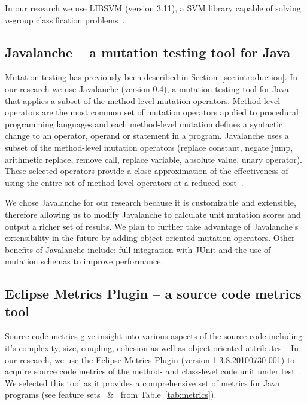 \documentclass[10pt,conference,compsocconf]{IEEEtran}
\begin{document}
In our research we use LIBSVM (version 3.11), a SVM library capable of solving \emph{n}-group classification problems~\cite{CL11}.


\subsection{Javalanche -- a mutation testing tool for Java}
\label{subsec:javalanche}
Mutation testing has previously been described in Section~\ref{sec:introduction}. In our research we use Javalanche (version 0.4), a mutation testing tool for Java~\cite{SZ09} that applies a subset of the method-level mutation operators. Method-level operators are the most common set of mutation operators applied to procedural programming languages and each method-level mutation defines a syntactic change to an operator, operand or statement in a program. Javalanche uses a subset of the method-level mutation operators (replace constant, negate jump, arithmetic replace, remove call, replace variable, absolute value, unary operator). These selected operators provide a close approximation of the effectiveness of using the entire set of method-level operators at a reduced cost~\cite{OLR+96}.

We chose Javalanche for our research because it is customizable and extensible, therefore allowing us to modify Javalanche to calculate unit mutation scores and output a richer set of results. We plan to further take advantage of Javalanche's extensibility in the future by adding object-oriented mutation operators. Other benefits of Javalanche include: full integration with JUnit and the use of mutation schemas to improve performance.

\subsection{Eclipse Metrics Plugin -- a source code metrics tool}
\label{subsec:Metrics}
Source code metrics give insight into various aspects of the source code including it's complexity, size, coupling, cohesion as well as object-oriented attributes~\cite{SCE05,McCa76,Kan02,HWY09,Hend95,SRD12}. In our research, we use the Eclipse Metrics Plugin (version 1.3.8.20100730-001) to acquire source code metrics of the method- and class-level code unit under test~\cite{Metrics}. We selected this tool as it provides a comprehensive set of metrics for Java programs (see feature sets ~\&~ from Table~\ref{tab:metrics}).
\end{document}
